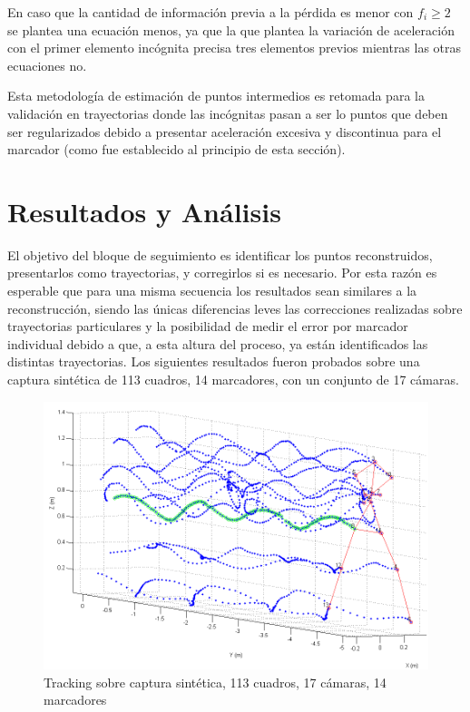 En caso que la cantidad de información previa a la pérdida es menor con $f_{i} \geq 2$ se plantea una ecuación menos, ya que la que plantea la variación de aceleración con el primer elemento incógnita precisa tres elementos previos mientras las otras ecuaciones no.

Esta metodología de estimación de puntos intermedios es retomada para la validación en trayectorias donde las incógnitas pasan a ser lo puntos que deben ser regularizados debido a presentar aceleración excesiva y discontinua para el marcador (como fue establecido al principio de esta sección).




\section{Resultados y Análisis}

El objetivo del bloque de seguimiento es identificar los puntos reconstruidos, presentarlos como trayectorias, y corregirlos si es necesario. Por esta razón es esperable que para una misma secuencia los resultados sean similares a la reconstrucción, siendo las únicas diferencias leves las correcciones realizadas sobre trayectorias particulares y la posibilidad de medir el error por marcador individual debido a que, a esta altura del proceso, ya están identificados las distintas trayectorias. Los siguientes resultados fueron probados sobre una captura sintética de 113 cuadros, 14 marcadores, con un conjunto de 17 cámaras.

\begin{figure}[ht!]
\vspace{-0.4cm}
\begin{center}
\includegraphics[scale=0.4]{img/Tracking/040_Salida_Tracking_Esqueleto_Trayectoria.png}
\end{center}
\vspace{-0.5cm}
\caption{Tracking sobre captura sintética, 113 cuadros, 17 cámaras, 14 marcadores}
\label{Tracking_Esqueleto_Trayectoria}
\end{figure}



